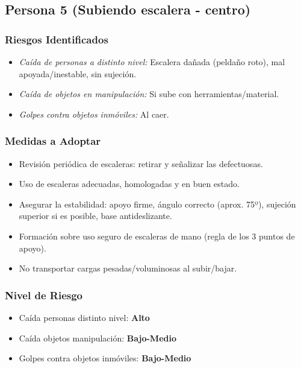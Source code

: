 \documentclass[12pt,a4paper]{article}
\begin{document}
	\bigskip\hrulefill\bigskip
	
	\subsection{Persona 5 (Subiendo escalera - centro)}
	
	\subsubsection{Riesgos Identificados}
	\begin{itemize}
		\item \textit{Caída de personas a distinto nivel:} Escalera dañada (peldaño roto), mal apoyada/inestable, sin sujeción.
		\item \textit{Caída de objetos en manipulación:} Si sube con herramientas/material.
		\item \textit{Golpes contra objetos inmóviles:} Al caer.
	\end{itemize}
	
	\subsubsection{Medidas a Adoptar}
	\begin{itemize}
		\item Revisión periódica de escaleras: retirar y señalizar las defectuosas.
		\item Uso de escaleras adecuadas, homologadas y en buen estado.
		\item Asegurar la estabilidad: apoyo firme, ángulo correcto (aprox. 75º), sujeción superior si es posible, base antideslizante.
		\item Formación sobre uso seguro de escaleras de mano (regla de los 3 puntos de apoyo).
		\item No transportar cargas pesadas/voluminosas al subir/bajar.
	\end{itemize}
	
	\subsubsection{Nivel de Riesgo}
	\begin{itemize}
		\item Caída personas distinto nivel: \textbf{Alto}
		\item Caída objetos manipulación: \textbf{Bajo-Medio}
		\item Golpes contra objetos inmóviles: \textbf{Bajo-Medio}
	\end{itemize}
	
\end{document}
